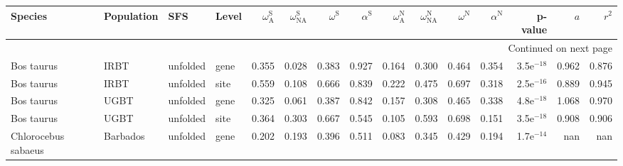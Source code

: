 \begin{longtable}{llllrrrrrrrrrrr}
\toprule
             Species &                Population &       SFS & Level & $\omega_{\textrm{A}}^{\textrm{S}}$ & $\omega_{\textrm{NA}}^{\textrm{S}}$ & $\omega^{\textrm{S}}$ & $\alpha^{\textrm{S}}$ & $\omega_{\textrm{A}}^{\textrm{N}}$ & $\omega_{\textrm{NA}}^{\textrm{N}}$ & $\omega^{\textrm{N}}$ & $\alpha^{\textrm{N}}$ &      p-value &    $a$ &  $r^2$ \\
\midrule
\endhead
\midrule
\multicolumn{15}{r}{{Continued on next page}} \\
\midrule
\endfoot

\bottomrule
\endlastfoot
          Bos taurus &                      IRBT &  unfolded &  gene &                              0.355 &                               0.028 &                 0.383 &                 0.927 &                              0.164 &                               0.300 &                 0.464 &                 0.354 & 3.5e$^{-18}$ &  0.962 &  0.876 \\
          Bos taurus &                      IRBT &  unfolded &  site &                              0.559 &                               0.108 &                 0.666 &                 0.839 &                              0.222 &                               0.475 &                 0.697 &                 0.318 & 2.5e$^{-16}$ &  0.889 &  0.945 \\
          Bos taurus &                      UGBT &  unfolded &  gene &                              0.325 &                               0.061 &                 0.387 &                 0.842 &                              0.157 &                               0.308 &                 0.465 &                 0.338 & 4.8e$^{-18}$ &  1.068 &  0.970 \\
          Bos taurus &                      UGBT &  unfolded &  site &                              0.364 &                               0.303 &                 0.667 &                 0.545 &                              0.105 &                               0.593 &                 0.698 &                 0.151 & 3.5e$^{-18}$ &  0.908 &  0.906 \\
 Chlorocebus sabaeus &                  Barbados &  unfolded &  gene &                              0.202 &                               0.193 &                 0.396 &                 0.511 &                              0.083 &                               0.345 &                 0.429 &                 0.194 & 1.7e$^{-14}$ &    nan &    nan \\

\end{longtable}
